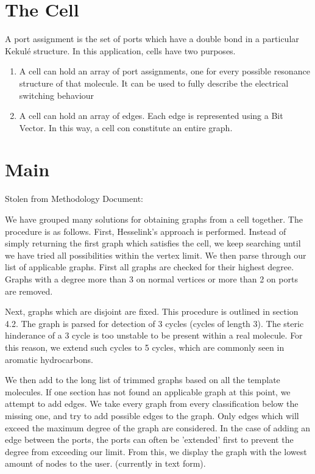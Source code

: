 \documentclass[12pt]{article}
\begin{document}
\section{The Cell}

A port assignment is the set of ports which have a double bond in a particular Kekul\'e structure. In this application, cells have two purposes. 

\begin{enumerate}
\item A cell can hold an array of port assignments, one for every possible resonance structure of that molecule. It can be used to fully describe the electrical switching behaviour 
\item A cell can hold an array of edges. Each edge is represented using a Bit Vector. In this way, a cell con constitute an entire graph.
\end{enumerate}

\section{Main}

Stolen from Methodology Document: 

We have grouped many solutions for obtaining graphs from a cell together. The procedure is as follows. First, Hesselink's approach is performed. Instead of simply returning the first graph which satisfies the cell, we keep searching until we have tried all possibilities within the vertex limit. We then parse through our list of applicable graphs. First all graphs are checked for their highest degree. Graphs with a degree more than 3 on normal vertices or more than 2 on ports are removed. 

Next, graphs which are disjoint are fixed. This procedure is outlined in section 4.2. The graph is parsed for detection of 3 cycles (cycles of length 3). The steric hinderance of a 3 cycle is too unstable to be present within a real molecule. For this reason, we extend such cycles to 5 cycles, which are commonly seen in aromatic hydrocarbons. 

We then add to the long list of trimmed graphs based on all the template molecules. If one section has not found an applicable graph at this point, we attempt to add edges. We take every graph from every classification below the missing one, and try to add possible edges to the graph. Only edges which will exceed the maximum degree of the graph are considered. In the case of adding an edge between the ports, the ports can often be 'extended' first to prevent the degree from exceeding our limit. From this, we display the graph with the lowest amount of nodes to the user. (currently in text form).
\end{document}
